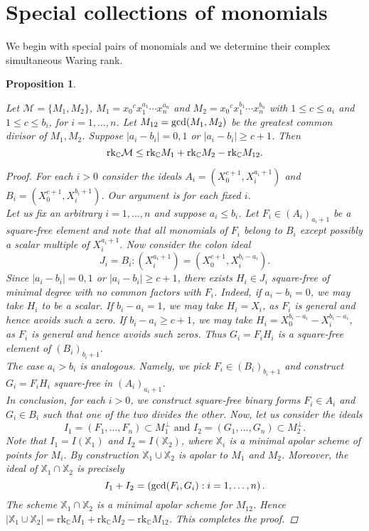 \documentclass{amsart}
\theoremstyle{plain}
\newtheorem{proposition}[theorem]{Proposition}
\theoremstyle{definition}
\theoremstyle{remark}
\begin{document}
\section{Special collections of monomials}

We begin with special pairs of monomials and we determine their complex simultaneous Waring rank.

\begin{proposition}\label{upperbound for pairs}

Let $\mathcal M=\lbrace M_1, M_2\rbrace$, $M_1={x_0}^{c}x_1^{a_1}\cdots x_n^{a_n}$ and $M_2={x_0}^{c}x_1^{b_1}\cdots x_n^{b_n}$ with $1\leq c \leq a_i$ and $1\leq c \leq b_i$, for $i=1,\ldots,n$. Let $M_{12} = \textnormal{gcd}(M_1,M_2)$ be the greatest common divisor of $M_1,M_2$. Suppose $| a_ i - b_i | = 0,1$ or $| a_ i - b_i |\geq c+1$. Then
$$
\textnormal{rk}_{\mathbb C} \mathcal M \leq \textnormal{rk}_{\mathbb C} M_1+\textnormal{rk}_{\mathbb C} M_2 - \textnormal{rk}_{\mathbb C} M_{12}.
$$

\begin{proof}
For each $i>0$ consider the ideals $A_i=(X_0^{c+1},X_i^{a_i+1})$ and $B_i=(X_0^{c+1},X_i^{b_i+1})$. Our argument is for each fixed $i$. \\
\indent Let us fix an arbitrary $i=1,\ldots,n$ and suppose $a_i\leq b_i$. Let $F_i\in (A_i)_{a_i+1}$ be a square-free element and note that all monomials of $F_i$ belong to $B_i$ except possibly a scalar multiple of $X_i^{a_i+1}$. Now consider the colon ideal
\[J_i=B_i:(X_i^{a_i+1})=(X_0^{c+1},X_i^{b_i-a_i}).\]
Since $| a_ i - b_i | = 0,1$ or $| a_ i - b_i |\geq c+1$, there exists $H_i\in J_i$ square-free of minimal degree with no common factors with $F_i$. Indeed, if $a_i-b_i = 0$, we may take $H_i$ to be a scalar. If $b_i - a_i = 1$, we may take $H_i = X_i$, as $F_i$ is general and hence avoids such a zero. If $b_i-a_i \geq c+1$, we may take $H_i = X_0^{b_i-a_i}-X_i^{b_i-a_i}$, as $F_i$ is general and hence avoids such zeros. Thus $G_i=F_iH_i$ is a square-free element of $(B_i)_{b_i+1}$. \\
\indent The case $a_i>b_i$ is analogous. Namely, we pick $F_i\in (B_i)_{b_i+1}$ and construct $G_i=F_iH_i$ square-free in $(A_i)_{a_i+1}$.\\
\indent In conclusion, for each $i>0$, we construct square-free binary forms $F_i\in A_i$ and $G_i\in B_i$ such that one of the two divides the other. Now, let us consider the ideals
\[I_1=(F_1,\ldots,F_n)\subset M_1^\perp\mbox{ and }I_2=(G_1,\ldots,G_n)\subset M_2^\perp.\]
Note that $I_1=I(\mathbb{X}_1)$ and $I_2=I(\mathbb{X}_2)$, where $\mathbb{X}_i$ is a minimal apolar scheme of points for $M_i$. By construction $\mathbb{X}_1\cup\mathbb{X}_2$ is apolar to $M_1$ and $M_2$. Moreover, the ideal of $\mathbb{X}_1\cap\mathbb{X}_2$ is precisely
\[I_1+I_2=\left( \textnormal{gcd}(F_i,G_i):i=1,\ldots,n\right).\]
The scheme $\mathbb{X}_1\cap\mathbb{X}_2$ is a minimal apolar scheme for $M_{12}$. Hence $|\mathbb{X}_1\cup\mathbb{X}_2|=\mathrm{rk}_{\mathbb C} M_1+\mathrm{rk}_{\mathbb C} M_2-\mathrm{rk}_{\mathbb C} M_{12}$. This completes the proof.
\end{proof}



\end{proposition}
\end{document}

